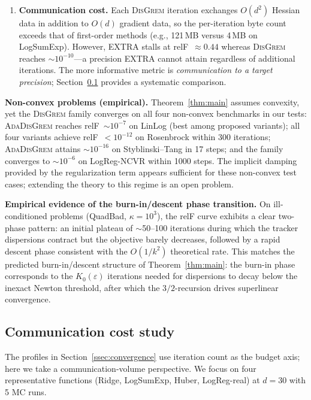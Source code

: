 \documentclass[11pt,a4paper]{article}
\def\cO{O}%
\newcommand{\cO}{\mathcal{O}}
\begin{document}
\begin{enumerate}[leftmargin=1.4em,itemsep=2pt]
		\item \textbf{Communication cost.}
		Each \textsc{DisGrem} iteration exchanges $\cO(d^2)$ Hessian
		data in addition to $\cO(d)$ gradient data, so the
		per-iteration byte count exceeds that of first-order methods
		(e.g., 121\,MB versus 4\,MB on LogSumExp).
		However, EXTRA stalls at relF~$\approx0.44$ whereas
		\textsc{DisGrem} reaches $\sim10^{-10}$---a precision EXTRA
		cannot attain regardless of additional iterations.
		The more informative metric is \emph{communication to a
		target precision}; Section~\ref{ssec:commexp} provides a
		systematic comparison.
	\end{enumerate}
	
	\noindent\textbf{Non-convex problems (empirical).}
	Theorem~\ref{thm:main} assumes convexity, yet the \textsc{DisGrem}
	family converges on all four non-convex benchmarks in our tests:
	\textsc{AdaDisGrem} reaches relF~$\sim10^{-7}$ on LinLog (best
	among proposed variants); all four variants achieve
	relF~$<10^{-12}$ on Rosenbrock within 300 iterations;
	\textsc{AdaDisGrem} attains $\sim10^{-16}$ on Styblinski--Tang in
	17 steps; and the family converges to $\sim10^{-6}$ on
	LogReg-NCVR within 1000 steps.
	The implicit damping provided by the regularization term appears
	sufficient for these non-convex test cases; extending the theory
	to this regime is an open problem.
	
	\noindent\textbf{Empirical evidence of the burn-in/descent phase transition.}
	On ill-conditioned problems (QuadBad, $\kappa{=}10^3$), the relF
	curve exhibits a clear two-phase pattern: an initial plateau of
	$\sim$50--100 iterations during which the tracker dispersions
	contract but the objective barely decreases, followed by a rapid
	descent phase consistent with the $\cO(1/k^2)$ theoretical rate.
	This matches the predicted burn-in/descent structure of
	Theorem~\ref{thm:main}: the burn-in phase corresponds to the
	$K_0(\varepsilon)$ iterations needed for dispersions to decay below
	the inexact Newton threshold, after which the $3/2$-recursion
	drives superlinear convergence.
	
	\subsection{Communication cost study}\label{ssec:commexp}
	
	The profiles in Section~\ref{ssec:convergence} use iteration count
	as the budget axis; here we take a communication-volume perspective.
	We focus on four representative functions (Ridge, LogSumExp, Huber,
	LogReg-real) at $d=30$ with 5 MC runs.
	
\end{document}
